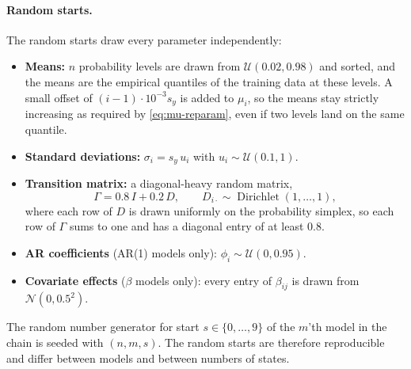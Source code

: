 \paragraph{Random starts.}
The random starts draw every parameter independently:
\begin{itemize}
    \item \textbf{Means:} $n$ probability levels are drawn from
    $\mathcal{U}(0.02, 0.98)$ and sorted, and the means are the empirical
    quantiles of the training data at these levels. A small offset of
    $(i-1) \cdot 10^{-3} s_y$ is added to $\mu_i$, so the means stay strictly
    increasing as required by \cref{eq:mu-reparam}, even if two levels land
    on the same quantile.
    \item \textbf{Standard deviations:} $\sigma_i = s_y \, u_i$ with
    $u_i \sim \mathcal{U}(0.1, 1)$.
    \item \textbf{Transition matrix:} a diagonal-heavy random matrix,
    \begin{equation}
        \Gamma = 0.8\, I + 0.2\, D, \qquad D_{i\cdot} \sim \operatorname{Dirichlet}(1, \dots, 1),
    \end{equation}
    where each row of $D$ is drawn uniformly on the probability simplex, so
    each row of $\Gamma$ sums to one and has a diagonal entry of at least $0.8$.
    \item \textbf{AR coefficients} (AR(1) models only): $\phi_i \sim \mathcal{U}(0, 0.95)$.
    \item \textbf{Covariate effects} ($\beta$ models only): every entry of
    $\beta_{ij}$ is drawn from $\mathcal{N}(0, 0.5^2)$.
\end{itemize}
The random number generator for start $s \in \{0, \dots, 9\}$ of the $m$'th
model in the chain is seeded with $(n, m, s)$. The random starts are therefore
reproducible and differ between models and between numbers of states.


